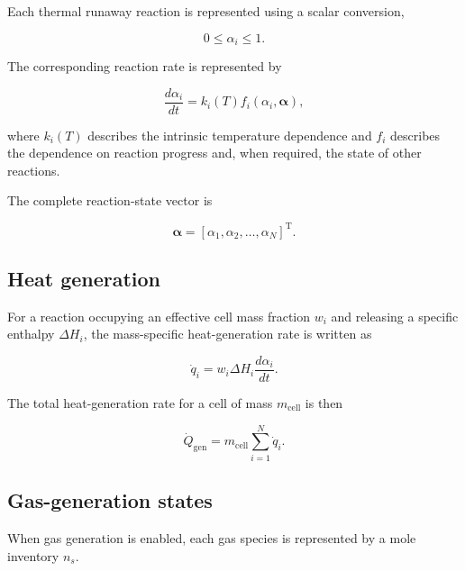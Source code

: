 Each thermal runaway reaction is represented using a scalar conversion,

\begin{equation}
    0
    \leq
    \alpha_i
    \leq
    1.
\end{equation}

The corresponding reaction rate is represented by

\begin{equation}
    \frac{d\alpha_i}{dt}
    =
    k_i(T)
    f_i
    \left(
        \alpha_i,
        \mathbf{\alpha}
    \right),
    \label{eq:reaction_progress_general}
\end{equation}

where $k_i(T)$ describes the intrinsic temperature dependence and
$f_i$ describes the dependence on reaction progress and, when required,
the state of other reactions.

The complete reaction-state vector is

\begin{equation}
    \boldsymbol{\alpha}
    =
    \left[
        \alpha_1,
        \alpha_2,
        \ldots,
        \alpha_N
    \right]^{\mathrm{T}}.
\end{equation}


\subsection{Heat generation}

For a reaction occupying an effective cell mass fraction $w_i$ and
releasing a specific enthalpy $\Delta H_i$, the mass-specific
heat-generation rate is written as

\begin{equation}
    \dot{q}_i
    =
    w_i
    \Delta H_i
    \frac{d\alpha_i}{dt}.
\end{equation}

The total heat-generation rate for a cell of mass $m_{\mathrm{cell}}$
is then

\begin{equation}
    \dot{Q}_{\mathrm{gen}}
    =
    m_{\mathrm{cell}}
    \sum_{i=1}^{N}
    \dot{q}_i.
    \label{eq:total_heat_generation}
\end{equation}


\subsection{Gas-generation states}

When gas generation is enabled, each gas species is represented by a
mole inventory $n_s$.

